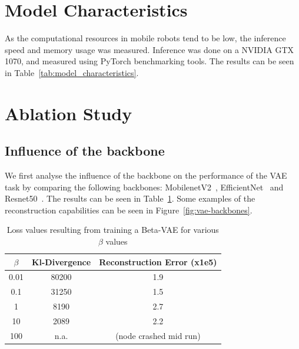 \section{Model Characteristics}

As the computational resources in mobile robots tend to be low, the inference speed and memory usage was measured. Inference was done on a NVIDIA GTX 1070, and measured using PyTorch benchmarking tools. The results can be seen in Table~\ref{tab:model_characteristics}.




\section{Ablation Study}
\subsection{Influence of the backbone}
We first analyse the influence of the backbone on the performance of the VAE task by comparing the following backbones: MobilenetV2~\cite{sandler2019mobilenetv2invertedresidualslinear}, EfficientNet~\cite{tan2020efficientnetrethinkingmodelscaling} and Resnet50~\cite{he2015deep}. The results can be seen in Table~\ref{tab:vae-backbones}. Some examples of the reconstruction capabilities can be seen in Figure~\ref{fig:vae-backbones}.

\begin{table}[!ht]
    \centering
    \caption{Loss values resulting from training a Beta-VAE for various $\beta$ values}
    \label{tab:vae-backbones}
    \begin{tabular}{ccc}
        \hline
        $\beta$ & Kl-Divergence & Reconstruction Error (x1e5) \\
        \hline
        0.01    & 80200         & 1.9                         \\
        0.1     & 31250         & 1.5                         \\
        1       & 8190          & 2.7                         \\
        10      & 2089          & 2.2                         \\
        100     & n.a.          & (node crashed mid run)      \\
        \hline
    \end{tabular}
\end{table}

